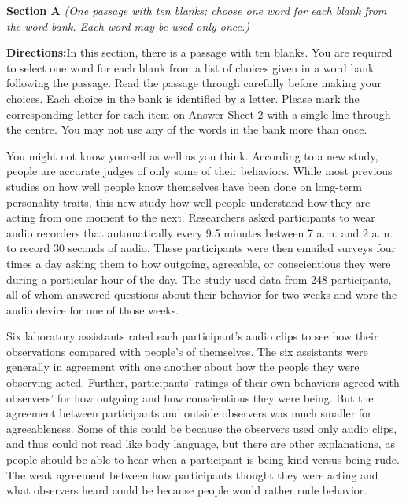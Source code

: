 \noindent\textbf{Section A}\quad
\noindent\textit{(One passage with ten blanks; choose one word for each blank from the word bank. Each word may be used only once.)}\par
\medskip
\noindent\textbf{Directions:}\quad In this section, there is a passage with ten blanks. You are required to select one word for each blank from a list of choices given in a word bank following the passage. Read the passage through carefully before making your choices. Each choice in the bank is identified by a letter. Please mark the corresponding letter for each item on Answer Sheet 2 with a single line through the centre. You may not use any of the words in the bank more than once.\par
\medskip
\noindent You might not know yourself as well as you think. According to a new study, people are  accurate judges of only some of their behaviors. While most previous studies on how well people know themselves have been done on long-term personality traits, this new study  how well people understand how they are acting from one moment to the next. Researchers asked participants to wear audio recorders that automatically  every 9.5 minutes between 7 a.m. and 2 a.m. to record 30 seconds of audio. These participants were then emailed surveys four times a day asking them to  how outgoing, agreeable, or conscientious they were during a particular hour of the day. The study used data from 248 participants, all of whom answered questions about their behavior for two  weeks and wore the audio device for one of those weeks.\par
\medskip
\noindent Six laboratory assistants rated each participant's audio clips to see how their observations compared with people's  of themselves. The six assistants were generally in agreement with one another about how the people they were observing acted. Further, participants' ratings of their own behaviors agreed with observers' for how outgoing and how conscientious they were being. But the agreement between participants and outside observers was much smaller for agreeableness. Some of this  could be because the observers used only audio clips, and thus could not read  like body language, but there are  other explanations, as people should be able to hear when a participant is being kind versus being rude. The weak agreement between how participants thought they were acting and what observers heard could be because people would rather  rude behavior.\par
